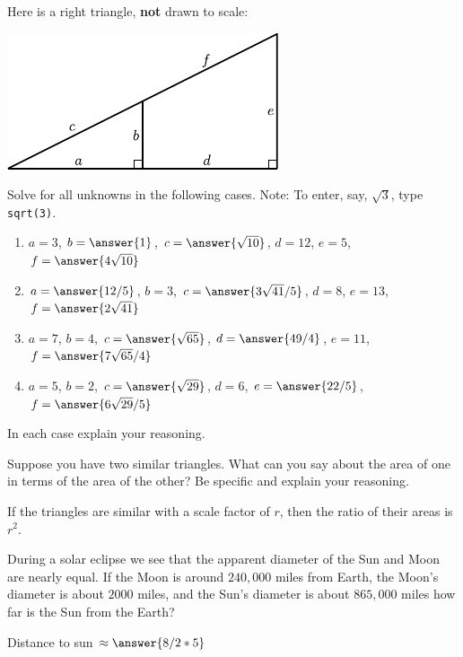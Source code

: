 \documentclass[nooutcomes]{ximera}
\begin{document}
\begin{question}
Here is a right triangle, \textbf{not} drawn to scale:
\begin{image}
\includegraphics{origamiSimQ.pdf}
\end{image}
Solve for all unknowns in the following cases.  Note:  To enter, say, $\sqrt{3}$, type \texttt{sqrt(3)}.
\begin{enumerate}
\item $a = 3$, $b = \answer{1}$, $c = \answer{\sqrt{10}}$, $d = 12$, $e = 5$, $f = \answer{4 \sqrt{10}}$
\item $a = \answer{12/5}$, $b = 3$, $c = \answer{3\sqrt{41}/5}$, $d =8$, $e = 13$, $f = \answer{2\sqrt{41}}$
\item $a = 7$, $b = 4$, $c = \answer{\sqrt{65}}$, $d =\answer{49/4}$, $e = 11$, $f = \answer{7\sqrt{65}/4}$
\item $a = 5$, $b = 2$, $c = \answer{\sqrt{29}}$, $d =6$, $e = \answer{22/5}$, $f = \answer{6\sqrt{29}/5}$
\end{enumerate}
In each case explain your reasoning.
\end{question}

\begin{question}
Suppose you have two similar triangles. What can you say about
  the area of one in terms of the area of the other? Be specific and
  explain your reasoning.
\begin{freeResponse}
\begin{hint}
If the triangles are similar with a scale factor of $r$, then the ratio of their areas is $r^2$. 
\end{hint}
\end{freeResponse}
\end{question}

\begin{question}
During a solar eclipse we see that the apparent diameter of the
  Sun and Moon are nearly equal. If the Moon is around $240,000$ miles
  from Earth, the Moon's diameter is about $2000$ miles, and the Sun's
  diameter is about $865,000$ miles how far is the Sun from the Earth?

Distance to sun $\approx \answer{8/2*5}$
\end{question}
\end{document}
